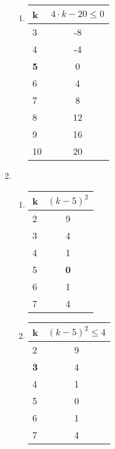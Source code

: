\documentclass[a4paper]{article}
\begin{document}
\begin{enumerate}
\begin{enumerate}
			\item
			\begin{center}
				\begin{tabular}{|l|c|}
					\firsthline
						k & $4 \cdot k - 20 \leq 0$ \\
					\hline
						3 & -8 \\
					\hline
						4 & -4 \\
					\hline
						\textbf{5} & 0 \\
					\hline
						6 & 4 \\
					\hline
						7 & 8 \\
					\hline
						8 & 12 \\
					\hline
						9 & 16 \\
					\hline
						10 & 20 \\
					\hline
				\end{tabular}
			\end{center}
		\end{enumerate}
		
		\item
		\begin{enumerate}
			\item
			\begin{center}
				\begin{tabular}{|l|c|}
					\firsthline
						k & $(k - 5)^{2}$ \\
					\hline
						2 & 9 \\
					\hline
						3 & 4 \\
					\hline
						4 & 1 \\
					\hline
						5 & \textbf{0} \\
					\hline
						6 & 1 \\
					\hline
						7 & 4 \\
					\hline
				\end{tabular}
			\end{center}
			
			\item
			\begin{center}
				\begin{tabular}{|l|c|}
					\firsthline
						k & $(k - 5)^{2} \leq 4$ \\
					\hline
						2 & 9 \\
					\hline
						\textbf{3} & 4 \\
					\hline
						4 & 1 \\
					\hline
						5 & 0 \\
					\hline
						6 & 1 \\
					\hline
						7 & 4 \\
					\hline
				\end{tabular}
			\end{center}
		\end{enumerate}
	\end{enumerate}
\end{document}
